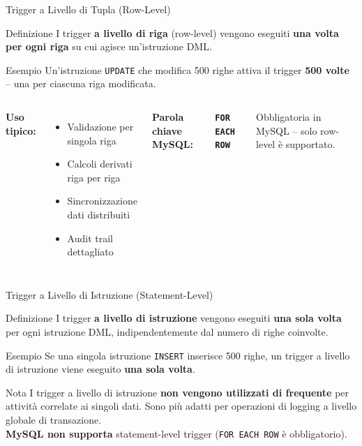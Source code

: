 \documentclass[aspectratio=169]{beamer}
\begin{document}
\begin{frame}{Trigger a Livello di Tupla (Row-Level)}
  \begin{block}{Definizione}
    I trigger \textbf{a livello di riga} (row-level) vengono eseguiti
    \textbf{una volta per ogni riga} su cui agisce un'istruzione DML.
  \end{block}
  \vspace{0.3cm}
  \begin{exampleblock}{Esempio}
    Un'istruzione \texttt{UPDATE} che modifica 500 righe attiva il trigger
    \textbf{500 volte} -- una per ciascuna riga modificata.
  \end{exampleblock}
  \vspace{0.3cm}
  \begin{columns}[T]
      \textbf{Uso tipico:}
      \begin{itemize}
        \item Validazione per singola riga
        \item Calcoli derivati riga per riga
        \item Sincronizzazione dati distribuiti
        \item Audit trail dettagliato
      \end{itemize}
      \textbf{Parola chiave MySQL:}
      \begin{center}
        \texttt{\textbf{FOR EACH ROW}}
      \end{center}
      Obbligatoria in MySQL -- solo row-level è supportato.
  \end{columns}
\end{frame}

\begin{frame}{Trigger a Livello di Istruzione (Statement-Level)}
  \begin{block}{Definizione}
    I trigger \textbf{a livello di istruzione} vengono eseguiti
    \textbf{una sola volta} per ogni istruzione DML, indipendentemente
    dal numero di righe coinvolte.
  \end{block}
  \vspace{0.3cm}
  \begin{exampleblock}{Esempio}
    Se una singola istruzione \texttt{INSERT} inserisce 500 righe, un trigger
    a livello di istruzione viene eseguito \textbf{una sola volta}.
  \end{exampleblock}
  \vspace{0.3cm}
  \begin{alertblock}{Nota}
    I trigger a livello di istruzione \textbf{non vengono utilizzati di frequente}
    per attività correlate ai singoli dati. Sono più adatti per operazioni di
    logging a livello globale di transazione.
    \\ \textbf{MySQL non supporta} statement-level trigger (\texttt{FOR EACH ROW} è obbligatorio).
  \end{alertblock}
\end{frame}
\end{document}
